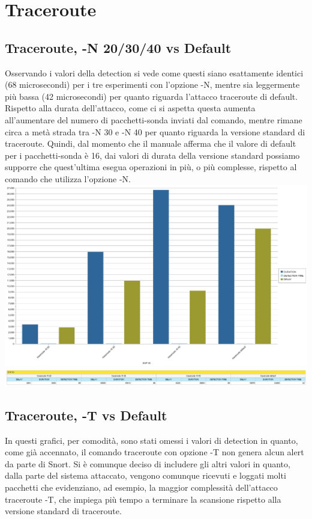\section{Traceroute}

\subsection{Traceroute, -N 20/30/40 vs Default}
Osservando i valori della detection si vede come questi siano esattamente identici (68 microsecondi) per i tre esperimenti con l'opzione -N, mentre sia leggermente più bassa (42 microsecondi) per quanto riguarda l'attacco traceroute di default. Rispetto alla durata dell'attacco, come ci si aspetta questa aumenta all'aumentare del numero di pacchetti-sonda inviati dal comando, mentre rimane circa a metà strada tra -N 30 e -N 40 per quanto riguarda la versione standard di traceroute. Quindi, dal momento che il manuale afferma che il valore di default per i pacchetti-sonda è 16, dai valori di durata della versione standard possiamo supporre che quest'ultima esegua operazioni in più, o più complesse, rispetto al comando che utilizza l'opzione -N.\\

\includegraphics[scale=0.3]{figure/tempi_traceroute_N.jpg}\\

\includegraphics[scale=0.3]{figure/tabella_traceroute_N.jpg}

\subsection{Traceroute, -T vs Default}
In questi grafici, per comodità, sono stati omessi i valori di detection in quanto, come già accennato, il comando traceroute con opzione -T non genera alcun alert da parte di Snort. Si è comunque deciso di includere gli altri valori in quanto, dalla parte del sistema attaccato, vengono comunque ricevuti e loggati molti pacchetti che evidenziano, ad esempio, la maggior complessità dell'attacco traceroute -T, che impiega più tempo a terminare la scansione rispetto alla versione standard di traceroute.\\


